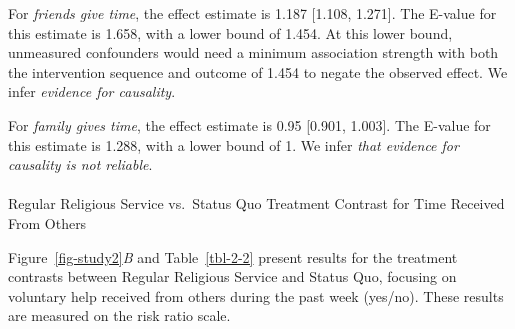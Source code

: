 \documentclass[
  single column]{article}
\makeatletter
\let\oldparagraph\paragraph
\renewcommand{\paragraph}{
    \@ifstar
      \xxxParagraphStar
      \xxxParagraphNoStar
  }
\newcommand{\xxxParagraphStar}[1]{\oldparagraph*{#1}\mbox{}}
\newcommand{\xxxParagraphNoStar}[1]{\oldparagraph{#1}\mbox{}}
\makeatother
\begin{document}
For \emph{friends give time}, the effect estimate is 1.187 {[}1.108,
1.271{]}. The E-value for this estimate is 1.658, with a lower bound of
1.454. At this lower bound, unmeasured confounders would need a minimum
association strength with both the intervention sequence and outcome of
1.454 to negate the observed effect. We infer \emph{evidence for
causality}.

For \emph{family gives time}, the effect estimate is 0.95 {[}0.901,
1.003{]}. The E-value for this estimate is 1.288, with a lower bound of
1. We infer \emph{that evidence for causality is not reliable}.

\paragraph{Regular Religious Service vs.~Status Quo Treatment Contrast
for Time Received From
Others}\label{regular-religious-service-vs.-status-quo-treatment-contrast-for-time-received-from-others}

Figure~\ref{fig-study2}\emph{B} and Table~\ref{tbl-2-2} present results
for the treatment contrasts between Regular Religious Service and Status
Quo, focusing on voluntary help received from others during the past
week (yes/no). These results are measured on the risk ratio scale.
\end{document}
